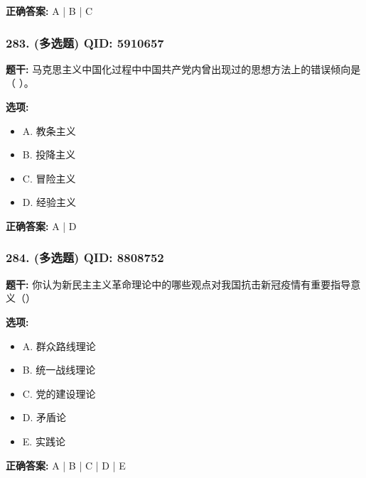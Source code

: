 \documentclass[12pt,UTF8]{ctexart}
\begin{document}
\textbf{正确答案:}
A | B | C

\vspace{0.3em}\hrulefill\vspace{0.7em}

\subsubsection*{283. (多选题) \small QID: 5910657}

\textbf{题干:}
马克思主义中国化过程中中国共产党内曾出现过的思想方法上的错误倾向是（ ）。

\textbf{选项:}
\begin{itemize}[leftmargin=*]

  \item A. 教条主义

  \item B. 投降主义

  \item C. 冒险主义

  \item D. 经验主义

\end{itemize}

\textbf{正确答案:}
A | D

\vspace{0.3em}\hrulefill\vspace{0.7em}

\subsubsection*{284. (多选题) \small QID: 8808752}

\textbf{题干:}
你认为新民主主义革命理论中的哪些观点对我国抗击新冠疫情有重要指导意义（）

\textbf{选项:}
\begin{itemize}[leftmargin=*]

  \item A. 群众路线理论

  \item B. 统一战线理论

  \item C. 党的建设理论

  \item D. 矛盾论

  \item E. 实践论

\end{itemize}

\textbf{正确答案:}
A | B | C | D | E
\end{document}

